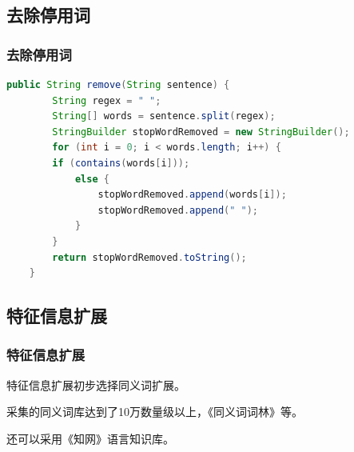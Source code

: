 \documentclass[CJKutf8, table, handout]{beamer}
\begin{document}
\begin{CJK}{UTF8}{gbsn}
\subsection{去除停用词}
\begin{frame}[fragile]
  \frametitle{去除停用词}
  \lstset{language=Java,basicstyle=\ttfamily,commentstyle=\ttfamily}
  \begin{tiny}
    \begin{block}{}
      \begin{lstlisting}[language=Java]
    public String remove(String sentence) {
        String regex = " ";
        String[] words = sentence.split(regex);
        StringBuilder stopWordRemoved = new StringBuilder();
        for (int i = 0; i < words.length; i++) {
        if (contains(words[i]));
            else {
                stopWordRemoved.append(words[i]);
                stopWordRemoved.append(" ");
            }
        }
        return stopWordRemoved.toString();
    }
      \end{lstlisting}
    \end{block}
  \end{tiny}
\end{frame}

\subsection{特征信息扩展}
\begin{frame}
  \frametitle{特征信息扩展}
  \begin{block}{}
    特征信息扩展初步选择同义词扩展。
  \end{block}
  \begin{block}{}
   采集的同义词库达到了10万数量级以上，《同义词词林》等。
  \end{block}
  \begin{block}{}
    还可以采用《知网》语言知识库。
  \end{block}
\end{frame}


\end{CJK}
\end{document}
